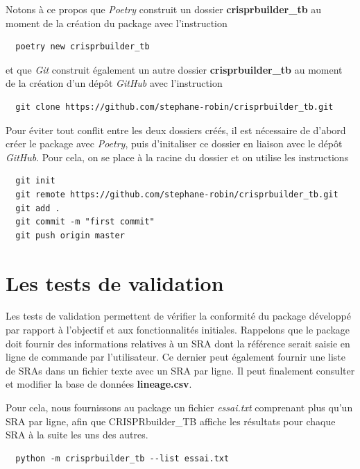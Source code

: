 \documentclass[twoside,a4paper,11pt,frenchb,openany]{report}
\begin{document}
Notons à ce propos que \textit{Poetry} construit un dossier \textbf{crisprbuilder\_tb} au moment de la création du package avec l'instruction

 \begin{verbatim}  poetry new crisprbuilder_tb\end{verbatim}

et que \textit{Git} construit également un autre dossier \textbf{crisprbuilder\_tb} au moment de la création d'un dépôt \textit{GitHub} avec l'instruction

\begin{verbatim}  git clone https://github.com/stephane-robin/crisprbuilder_tb.git\end{verbatim}

Pour éviter tout conflit entre les deux dossiers créés, il est nécessaire de d'abord créer le package avec \textit{Poetry}, puis d'initaliser ce dossier en liaison avec le dépôt \textit{GitHub}. Pour cela, on se place à la racine du dossier et on utilise les instructions

\begin{verbatim}
  git init
  git remote https://github.com/stephane-robin/crisprbuilder_tb.git
  git add .
  git commit -m "first commit"
  git push origin master
\end{verbatim} 





\section{Les tests de validation}

Les tests de validation permettent de vérifier la conformité du package développé par rapport à l'objectif et aux fonctionnalités initiales. Rappelons que le package doit fournir des informations relatives à un SRA dont la référence serait saisie en ligne de commande par l'utilisateur. Ce dernier peut également fournir une liste de SRAs dans un fichier texte avec un SRA par ligne. Il peut finalement consulter et modifier la base de données \textbf{lineage.csv}.

Pour cela, nous fournissons au package un fichier \textit{essai.txt} comprenant plus qu'un SRA par ligne, afin que CRISPRbuilder\_TB affiche les résultats pour chaque SRA à la suite les uns des autres.   

\begin{verbatim}
  python -m crisprbuilder_tb --list essai.txt
\end{verbatim}
\end{document}
